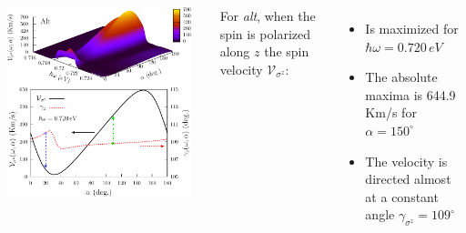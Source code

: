 \documentclass{beamer}
\begin{document}
\begin{frame}

\begin{columns}


\begin{center}

\includegraphics[width=0.95\textwidth]{figs/fig6.pdf}

\end{center}  



{ For \emph{alt}, when the spin is polarized along $z$ the spin velocity
$\mathcal{V}_{\sigma^{z}}$:}


\vspace{-2mm}

{\small

\begin{itemize}

\item 
Is maximized for $\hbar \omega = 0.720\,eV$

\vspace{-1mm}
\item 
The absolute maxima is 644.9\,Km/s for $\alpha = 150^{\circ}$

\vspace{-1mm}
\item 
The velocity is directed almost at a constant angle $\gamma_{\sigma^{z}} =
109^{\circ}$


\end{itemize}}
\end{columns}
\end{frame}
\end{document}
